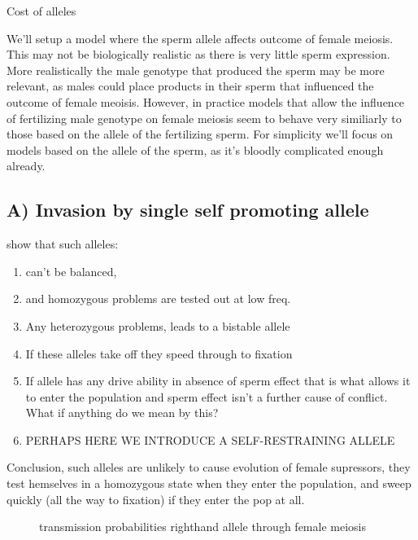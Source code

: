 \documentclass[12pt,letterpaper]{article}
\begin{document}
Cost of alleles

We'll setup a model where the sperm allele affects outcome of female meiosis. This may not be biologically
realistic as there is very little sperm expression. More realistically the male genotype that produced the sperm
may be more relevant, as males could place products in their sperm that influenced the outcome of female meoisis.
However, in practice models that allow the influence of fertilizing male genotype on female meiosis 
seem to behave very similiarly to those based on the allele of the fertilizing sperm.
For simplicity we'll focus on models based on the allele of the sperm, as it's bloodly complicated enough already.

\subsection*{ A) Invasion by single self promoting allele}
show that such alleles:
\begin{enumerate}
\item can't be balanced, \\
\item and homozygous problems are tested out at low freq.  \\
\item Any heterozygous problems, leads to a bistable allele\\
\item If these alleles take off they speed through to fixation\\
\item If allele has any drive ability in absence of sperm effect that is what allows it to enter the population
and sperm effect isn't a further cause of conflict. What if anything do we mean by this?\\
\item PERHAPS HERE WE INTRODUCE A SELF-RESTRAINING ALLELE
\end{enumerate}

Conclusion, such alleles are unlikely to cause evolution of female supressors, they test hemselves in a homozygous
state when they enter the population, and sweep quickly (all the way to fixation) if they enter the pop at all.\\

\begin{figure}
\caption{transmission probabilities righthand allele through female
  meiosis}  \label{Eggsperm_3_allele_cartoon}
\end{figure}
\end{document}
